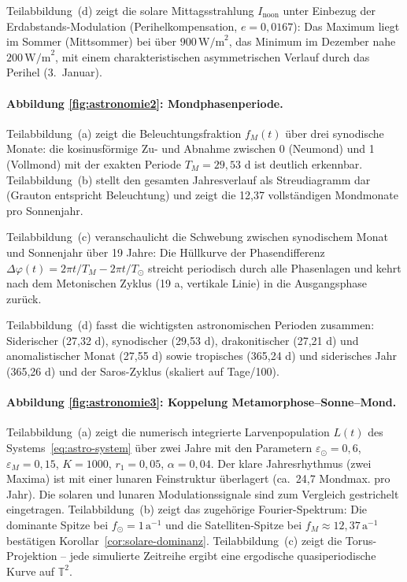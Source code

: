 ﻿\documentclass[12pt, a4paper]{article}
\theoremstyle{definition}
\begin{document}
Teilabbildung~(d) zeigt die solare Mittagsstrahlung $I_{\text{noon}}$ unter
Einbezug der Erdabstands-Modulation (Perihelkompensation, $e = 0{,}0167$):
Das Maximum liegt im Sommer (Mittsommer) bei über $900\,\text{W/m}^2$,
das Minimum im Dezember nahe $200\,\text{W/m}^2$, mit einem charakteristischen
asymmetrischen Verlauf durch das Perihel (3.~Januar).

\paragraph{Abbildung \ref{fig:astronomie2}: Mondphasenperiode.}
Teilabbildung~(a) zeigt die Beleuchtungsfraktion $f_M(t)$ über drei synodische
Monate: die kosinusförmige Zu- und Abnahme zwischen 0 (Neumond) und 1 (Vollmond)
mit der exakten Periode $T_M = 29{,}53$ d ist deutlich erkennbar. Teilabbildung~(b)
stellt den gesamten Jahresverlauf als Streudiagramm dar (Grauton entspricht
Beleuchtung) und zeigt die 12{,}37 vollständigen Mondmonate pro Sonnenjahr.

Teilabbildung~(c) veranschaulicht die Schwebung zwischen synodischem Monat
und Sonnenjahr über 19 Jahre: Die Hüllkurve der Phasendifferenz
$\Delta\varphi(t) = 2\pi t/T_M - 2\pi t/T_{\odot}$ streicht periodisch durch
alle Phasenlagen und kehrt nach dem Metonischen Zyklus (19 a, vertikale Linie)
in die Ausgangsphase zurück.

Teilabbildung~(d) fasst die wichtigsten astronomischen Perioden zusammen:
Siderischer (27{,}32 d), synodischer (29{,}53 d), drakonitischer (27{,}21 d)
und anomalistischer Monat (27{,}55 d) sowie tropisches (365{,}24 d) und
siderisches Jahr (365{,}26 d) und der Saros-Zyklus (skaliert auf Tage/100).

\paragraph{Abbildung \ref{fig:astronomie3}: Koppelung Metamorphose--Sonne--Mond.}
Teilabbildung~(a) zeigt die numerisch integrierte Larvenpopulation $L(t)$
des Systems~\eqref{eq:astro-system} über zwei Jahre mit den Parametern
$\varepsilon_{\odot} = 0{,}6$, $\varepsilon_M = 0{,}15$, $K = 1000$,
$r_1 = 0{,}05$, $\alpha = 0{,}04$. Der klare Jahresrhythmus (zwei Maxima)
ist mit einer lunaren Feinstruktur überlagert (ca.\ 24{,}7 Mondmax. pro Jahr).
Die solaren und lunaren Modulationssignale sind zum Vergleich gestrichelt
eingetragen. Teilabbildung~(b) zeigt das zugehörige Fourier-Spektrum:
Die dominante Spitze bei $f_{\odot} = 1\,\text{a}^{-1}$ und die
Satelliten-Spitze bei $f_M \approx 12{,}37\,\text{a}^{-1}$ bestätigen
Korollar~\ref{cor:solare-dominanz}. Teilabbildung~(c) zeigt die
Torus-Projektion -- jede simulierte Zeitreihe ergibt eine ergodische
quasiperiodische Kurve auf $\mathbb{T}^2$.
\end{document}
